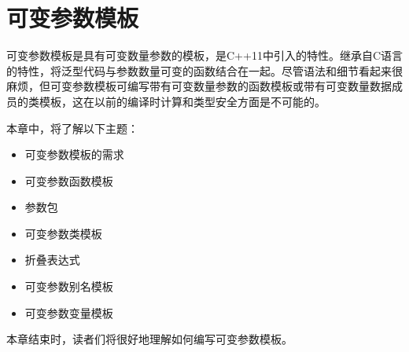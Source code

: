 \chapter{可变参数模板}
可变参数模板是具有可变数量参数的模板，是C++11中引入的特性。继承自C语言的特性，将泛型代码与参数数量可变的函数结合在一起。尽管语法和细节看起来很麻烦，但可变参数模板可编写带有可变数量参数的函数模板或带有可变数量数据成员的类模板，这在以前的编译时计算和类型安全方面是不可能的。

本章中，将了解以下主题：

\begin{itemize}
  \item 可变参数模板的需求
  \item 可变参数函数模板
  \item 参数包
  \item 可变参数类模板
  \item 折叠表达式
  \item 可变参数别名模板
  \item 可变参数变量模板
\end{itemize}

本章结束时，读者们将很好地理解如何编写可变参数模板。










